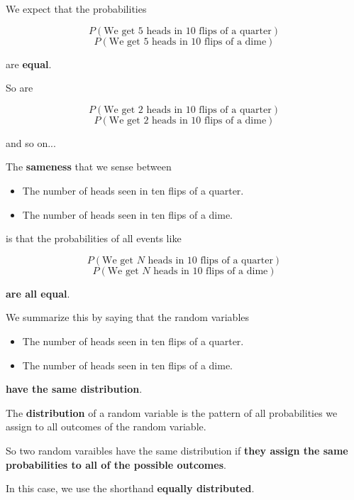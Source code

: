 %
\begin{frame}

We expect that the probabilities

$$ P(\text{We get 5 heads in 10 flips of a quarter}) $$
$$ P(\text{We get 5 heads in 10 flips of a dime}) $$

are \textbf{equal}.

\hfill

So are

$$ P(\text{We get 2 heads in 10 flips of a quarter}) $$
$$ P(\text{We get 2 heads in 10 flips of a dime}) $$

and so on...
\end{frame}
%

%
\begin{frame}
The \textbf{sameness} that we sense between

\begin{itemize}
\item The number of heads seen in ten flips of a quarter.
\item The number of heads seen in ten flips of a dime.
\end{itemize}

is that the probabilities of all events like

$$ P(\text{We get } N \text{ heads in 10 flips of a quarter}) $$
$$ P(\text{We get } N \text{ heads in 10 flips of a dime}) $$

\textbf{are all equal}.
\end{frame}
%

%
\begin{frame}
We summarize this by saying that the random variables


\begin{itemize}
\item The number of heads seen in ten flips of a quarter.
\item The number of heads seen in ten flips of a dime.
\end{itemize}

\textbf{have the same distribution}.

\hfill

The \textbf{distribution} of a random variable is the pattern of all
probabilities we assign to all outcomes of the random variable.
\end{frame}

%
\begin{frame}
So two random varaibles have the same distribution if \textbf{they assign the
same probabilities to all of the possible outcomes}.

In this case, we use the shorthand \textbf{equally distributed}.
\end{frame}
%
